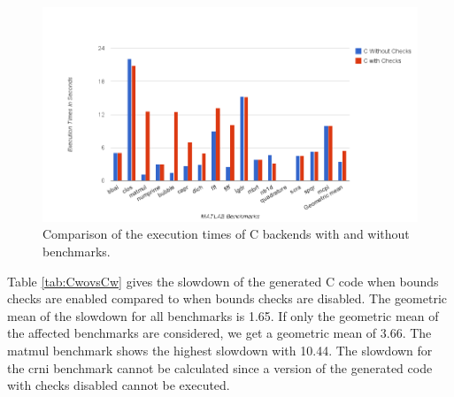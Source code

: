 \begin{figure}[htbp]
\centering
\includegraphics[scale=0.5]{Figures/results_cwchecks.png}
\caption{Comparison of the execution times of C backends with and without benchmarks. }
\label{fig:results_cwchecks}
\end{figure}
 Table \ref{tab:CwovsCw} gives the slowdown of the generated C code when bounds checks are enabled compared to when bounds checks are disabled. The geometric mean of the slowdown for all benchmarks is 1.65. If only the geometric mean of the affected benchmarks are considered, we get a geometric mean of 3.66. The matmul benchmark shows the highest slowdown with 10.44. The slowdown for the crni benchmark cannot be calculated since a version of the generated code with checks disabled cannot be executed. 

